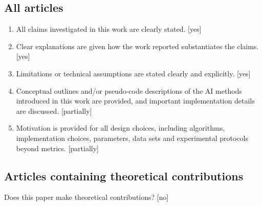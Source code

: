 \documentclass[manuscript,screen,review]{jair}
\begin{document}
\subsection*{All articles}
\begin{enumerate}[leftmargin=*]
  \item All claims investigated in this work are clearly stated. [yes]
  \item Clear explanations are given how the work reported substantiates the claims. [yes]
  \item Limitations or technical assumptions are stated clearly and explicitly. [yes]
  \item Conceptual outlines and/or pseudo-code descriptions of the AI methods introduced in this work are provided, and important implementation details are discussed. [partially]
  \item Motivation is provided for all design choices, including algorithms, implementation choices, parameters, data sets and experimental protocols beyond metrics. [partially]
\end{enumerate}

\subsection*{Articles containing theoretical contributions}
Does this paper make theoretical contributions? [no]
\end{document}

